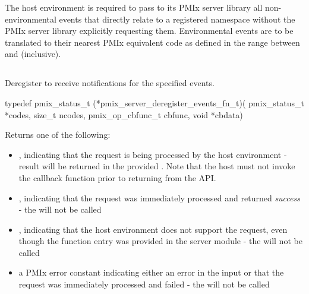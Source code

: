 \adviceimplend

\advicermstart
The host environment is required to pass to its \ac{PMIx} server library all non-environmental events that directly relate to a registered namespace without the \ac{PMIx} server library explicitly requesting them. Environmental events are to be translated to their nearest \ac{PMIx} equivalent code as defined in the range between  and  (inclusive).
\advicermend


\subsection{}

\summary

Deregister to receive notifications for the specified events.

\format

\cspecificstart
\begin{codepar}
 typedef pmix_status_t (*pmix_server_deregister_events_fn_t)(
                              pmix_status_t *codes,
                              size_t ncodes,
                              pmix_op_cbfunc_t cbfunc,
                              void *cbdata)
\end{codepar}
\cspecificend

\begin{arglist}
\end{arglist}

Returns one of the following:

\begin{itemize}
    \item {}, indicating that the request is being processed by the host environment - result will be returned in the provided . Note that the host must not invoke the callback function prior to returning from the \ac{API}.
    \item {}, indicating that the request was immediately processed and returned \textit{success} - the  will not be called
    \item {}, indicating that the host environment does not support the request, even though the function entry was provided in the server module - the  will not be called
    \item a PMIx error constant indicating either an error in the input or that the request was immediately processed and failed - the  will not be called
\end{itemize}

